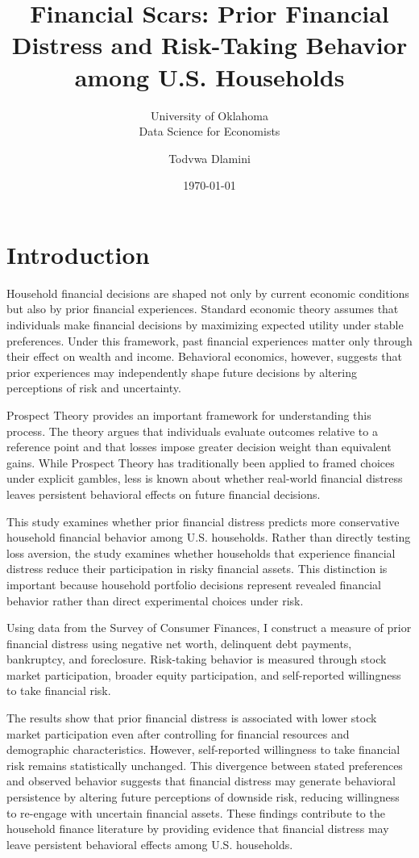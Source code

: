 \documentclass[12pt]{article}
\title{Financial Scars: Prior Financial Distress and Risk-Taking Behavior among U.S. Households}
\subtitle{University of Oklahoma\\Data Science for Economists}
\author{Todvwa Dlamini}
\date{\today}
\begin{document}
\maketitle



\newpage
{} 
 

\section{Introduction}

Household financial decisions are shaped not only by current economic conditions but also by prior financial experiences. Standard economic theory assumes that individuals make financial decisions by maximizing expected utility under stable preferences. Under this framework, past financial experiences matter only through their effect on wealth and income. Behavioral economics, however, suggests that prior experiences may independently shape future decisions by altering perceptions of risk and uncertainty.

\medskip
Prospect Theory \citep{kahneman1979prospect} provides an important framework for understanding this process. The theory argues that individuals evaluate outcomes relative to a reference point and that losses impose greater decision weight than equivalent gains. While Prospect Theory has traditionally been applied to framed choices under explicit gambles, less is known about whether real-world financial distress leaves persistent behavioral effects on future financial decisions.

\medskip
This study examines whether prior financial distress predicts more conservative household financial behavior among U.S. households. Rather than directly testing loss aversion, the study examines whether households that experience financial distress reduce their participation in risky financial assets. This distinction is important because household portfolio decisions represent revealed financial behavior rather than direct experimental choices under risk.

\medskip
Using data from the Survey of Consumer Finances, I construct a measure of prior financial distress using negative net worth, delinquent debt payments, bankruptcy, and foreclosure. Risk-taking behavior is measured through stock market participation, broader equity participation, and self-reported willingness to take financial risk.

\medskip
The results show that prior financial distress is associated with lower stock market participation even after controlling for financial resources and demographic characteristics. However, self-reported willingness to take financial risk remains statistically unchanged. This divergence between stated preferences and observed behavior suggests that financial distress may generate behavioral persistence by altering future perceptions of downside risk, reducing willingness to re-engage with uncertain financial assets. These findings contribute to the household finance literature by providing evidence that financial distress may leave persistent behavioral effects among U.S. households.
\end{document}
